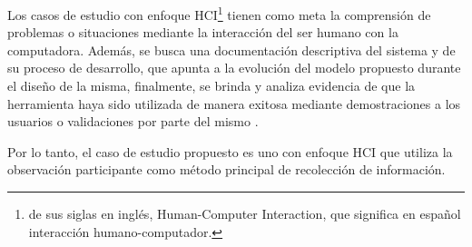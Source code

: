 Los casos de estudio con enfoque HCI\footnote{de sus siglas en inglés, Human-Computer Interaction, que significa en español interacción humano-computador.} tienen como meta la comprensión de problemas o situaciones mediante la interacción del ser humano con la computadora. Además, se busca una documentación descriptiva del sistema y de su proceso de desarrollo, que apunta a la evolución del modelo propuesto durante el diseño de la misma, finalmente, se brinda y analiza evidencia de que la herramienta haya sido utilizada de manera exitosa mediante demostraciones a los usuarios o validaciones por parte del mismo \citep{lazar_research_2010}. 

Por lo tanto, el caso de estudio propuesto es uno con enfoque HCI que utiliza la observación participante como método principal de recolección de información.